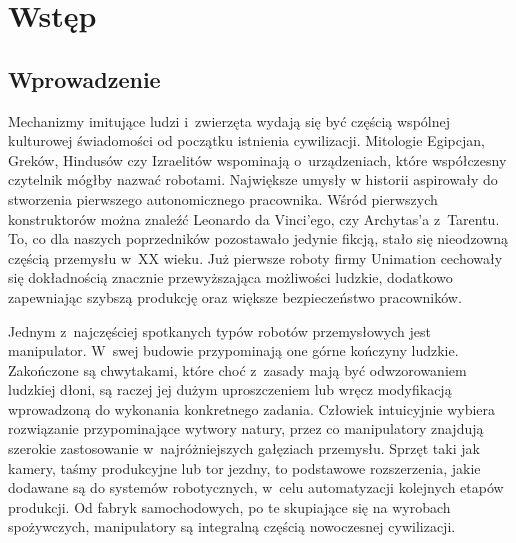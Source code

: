 
\chapter{Wstęp}
\label{ch:wstep}
	
	
		\section{Wprowadzenie}
		\label{s:wprowadzenie}
		Mechanizmy imitujące ludzi i~zwierzęta wydają się być częścią wspólnej kulturowej świadomości od początku istnienia cywilizacji. Mitologie Egipcjan, Greków, Hindusów czy Izraelitów wspominają o~urządzeniach, które współczesny czytelnik mógłby nazwać robotami. Największe umysły w historii aspirowały do stworzenia pierwszego autonomicznego pracownika. Wśród pierwszych konstruktorów można znaleźć Leonardo da Vinci'ego, czy Archytas'a z~Tarentu. To, co dla naszych poprzedników pozostawało jedynie fikcją, stało się nieodzowną częścią przemysłu w~XX wieku. Już pierwsze roboty firmy Unimation cechowały się dokładnością znacznie przewyższająca możliwości ludzkie, dodatkowo zapewniając szybszą produkcję oraz większe bezpieczeństwo pracowników. 
		
		Jednym z~najczęściej spotkanych typów robotów przemysłowych jest manipulator. W~swej budowie przypominają one górne kończyny ludzkie. Zakończone są chwytakami, które choć z~zasady mają być odwzorowaniem ludzkiej dłoni, są raczej jej dużym uproszczeniem lub wręcz modyfikacją wprowadzoną do wykonania konkretnego zadania. Człowiek intuicyjnie wybiera rozwiązanie przypominające wytwory natury, przez co manipulatory znajdują szerokie zastosowanie w~najróżniejszych gałęziach przemysłu.  Sprzęt taki jak kamery, taśmy produkcyjne lub tor jezdny, to podstawowe rozszerzenia, jakie dodawane są do systemów robotycznych, w~celu automatyzacji kolejnych etapów produkcji. Od fabryk samochodowych, po te skupiające się na wyrobach spożywczych, manipulatory są integralną częścią nowoczesnej cywilizacji.

		
